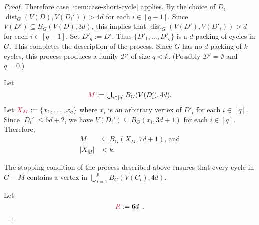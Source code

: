 \documentclass{patmorin}
\DeclareMathOperator{\dist}{dist}
\begin{document}
\begin{proof}
   Therefore case \cref{item:case-short-cycle} applies.  By the choice of $D$,  
   $\dist_G(V(D),V(D_i'))>4d$ for each $i\in[q-1]$.  Since $V(D')\subseteq B_G(V(D),3d)$, this implies that $\dist_G(V(D'),V(D'_i))>d$ for each $i\in[q-1]$. Set $D'_q:=D'$. 
   Thus $\{D'_1,\ldots,D'_q\}$ is a $d$-packing of cycles in $G$.  
   This completes the description of the process.
   Since $G$ has no $d$-packing of $k$ cycles, this process produces a family $\mathcal{D'}$ of size $q<k$. 
   (Possibly $\mathcal{D'}=\emptyset$ and $q=0$.) 

   Let
   \[
        \textstyle\mathdefin{M}:=\bigcup_{i\in[q]}B_G(V(D'_i),4d).
   \]
  Let $\mathdefin{X_M}:=\{x_1,\ldots,x_{q}\}$ where  $x_i$ is an arbitrary vertex of $D'_i$ for each $i\in[q]$. 
  Since $|D_i'|\leq 6d+2$, we have $V(D_i')\subseteq B_G(x_i,3d+1)$ for each $i\in[q]$. 
  Therefore, 
\begin{align}
  M&\subseteq B_G(X_M,7d+1)\text{, and}\label{eq:M-contained-in-a-ball}\\
  |X_M|&< k.\label{eq:XM-size}
\end{align}

The stopping condition of the process described above ensures that 
every cycle in $G-M$ contains a vertex in $\bigcup_{i=1}^p B_G(V(C_i),4d)$.

Let
\[
\mathdefin{R}:=6d\enspace .
\]


\end{proof}
\end{document}
